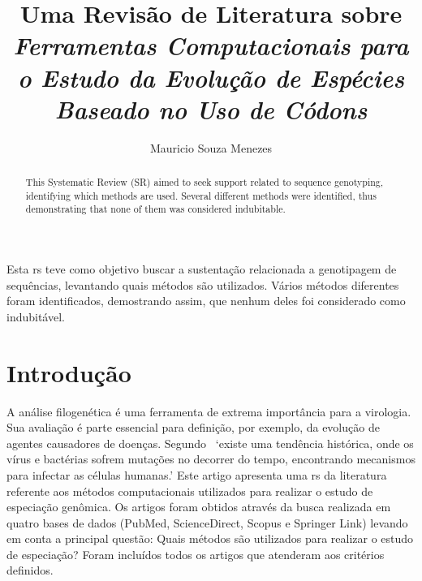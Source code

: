 \documentclass[12pt]{article}
\title{Uma Revisão de Literatura sobre \textit{Ferramentas Computacionais para
        o Estudo da Evolução de Espécies Baseado no Uso de Códons}}
\author{Mauricio Souza Menezes\\}
\begin{document}

\maketitle

\begin{resumo}
    Esta \gls{rs} teve como objetivo buscar a sustentação relacionada a genotipagem de sequências, levantando quais métodos são utilizados.
    Vários métodos diferentes foram identificados, demostrando assim, que nenhum deles foi considerado como indubitável.
\end{resumo}

\begin{abstract}
    \begin{otherlanguage}{english}
        This Systematic Review (SR) aimed to seek support related to sequence genotyping, identifying which methods are used. Several different methods were identified, thus demonstrating that none of them was considered indubitable.
    \end{otherlanguage}
\end{abstract}

\section{Introdução}

A análise filogenética é uma ferramenta de extrema importância para a virologia. Sua avaliação é parte essencial para definição, por exemplo, da evolução de agentes causadores de doenças.
Segundo~\cite{behl_threat_2022} `existe uma tendência histórica, onde os vírus e bactérias sofrem mutações no decorrer do tempo, encontrando mecanismos para infectar as células humanas.'
Este artigo apresenta uma \gls{rs} da literatura referente aos métodos computacionais utilizados para realizar o estudo de especiação genômica. Os artigos foram obtidos através da busca realizada em quatro bases de dados (PubMed, ScienceDirect, Scopus e Springer Link) levando em conta a principal questão: Quais métodos são utilizados para realizar o estudo de especiação? Foram incluídos todos os artigos que atenderam aos critérios definidos.
\end{document}
